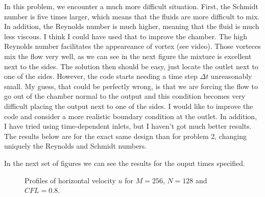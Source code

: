 In this problem, we encounter a much more difficult situation. First, the Schmidt number is five times larger, which means that the fluids are more difficult to mix. In addition, the Reynolds number is much higher, meaning that the fluid is much less viscous. I think I could have used that to improve the chamber. The high Reynolds number facilitates the appeareance of vortex (see video). Those vorteces mix the flow very well, as we can see in the next figure the mixture is excellent next to the sides. The solution then should be easy, just locate the outlet next to one of the sides. However, the code starts needing a time step $\Delta t$ unreasonably small. My guess, that could be perfectly wrong, is that we are forcing the flow to go out of the chamber normal to the output and this condition becomes very difficult placing the output next to one of the sides. I would like to improve the code and consider a more realistic boundary condition at the outlet. In addition, I have tried using time-dependent inlets, but I haven't got much better results. The results below are for the exact same design than for problem 2, changing uniquely the Reynolds and Schmidt numbers.

In the next set of figures we can see the results for the ouput times specified.

\begin{figure}[H]
\centering     %
\hspace*{\fill}
\hfill
{}
\hspace*{\fill}

\hspace*{\fill}
\hfill
{}
\hspace*{\fill}

\hspace*{\fill}
\hfill
{}
\hspace*{\fill}

\caption{Profiles of horizontal velocity $u$ for $M=256$, $N=128$ and $CFL=0.8$.}
\end{figure}

